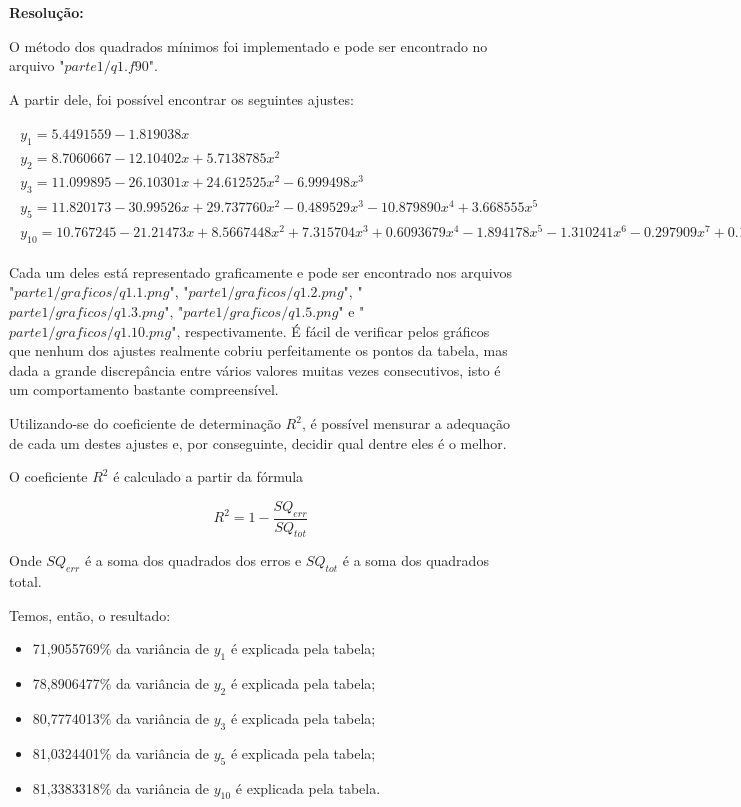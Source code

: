 \documentclass[12pt]{article}
\begin{document}
\textbf{Resolução:}

O método dos quadrados mínimos foi implementado e pode ser encontrado no arquivo "$\textit{parte1/q1.f90}$".

A partir dele, foi possível encontrar os seguintes ajustes:

\begin{eqnarray}
    \begin{split}
        y_{1} = 5.4491559 - 1.819038x \\
        y_{2} = 8.7060667 - 12.10402x + 5.7138785x^{2} \\
        y_{3} = 11.099895 - 26.10301x + 24.612525x^{2} - 6.999498x^{3} \\
        y_{5} = 11.820173 - 30.99526x + 29.737760x^{2} - 0.489529x^{3} - 10.879890x^{4} + 3.668555x^{5} \\
        y_{10} = 10.767245 - 21.21473x + 8.5667448x^{2} + 7.315704x^{3} + 0.6093679x^{4} - 1.894178x^{5} - 1.310241x^{6} - 0.297909x^{7} + 0.1513477x^{8} + 0.159235x^{9} + 0.025067x^{10}
    \end{split}
\end{eqnarray}

Cada um deles está representado graficamente e pode ser encontrado nos arquivos "$parte1/graficos/q1.1.png$", "$parte1/graficos/q1.2.png$", "$parte1/graficos/q1.3.png$", "$parte1/graficos/q1.5.png$" e "$parte1/graficos/q1.10.png$", respectivamente.
É fácil de verificar pelos gráficos que nenhum dos ajustes realmente cobriu perfeitamente os pontos da tabela, mas dada a grande discrepância entre vários valores muitas vezes consecutivos, isto é um comportamento bastante compreensível.

Utilizando-se do coeficiente de determinação $R^{2}$, é possível mensurar a adequação de cada um destes ajustes e, por conseguinte, decidir qual dentre eles é o melhor.

O coeficiente $R^{2}$ é calculado a partir da fórmula

\begin{equation}
    R^{2} = 1 - \frac{SQ_{err}}{SQ_{tot}}
\end{equation}

Onde $SQ_{err}$ é a soma dos quadrados dos erros e ${SQ_{tot}}$ é a soma dos quadrados total.

Temos, então, o resultado:

\begin{itemize}[noitemsep]
\item 71,9055769\% da variância de $y_{1}$ é explicada pela tabela;
\item 78,8906477\% da variância de $y_{2}$ é explicada pela tabela;
\item 80,7774013\% da variância de $y_{3}$ é explicada pela tabela;
\item 81,0324401\% da variância de $y_{5}$ é explicada pela tabela;
\item 81,3383318\% da variância de $y_{10}$ é explicada pela tabela.
\end{itemize}
\end{document}
